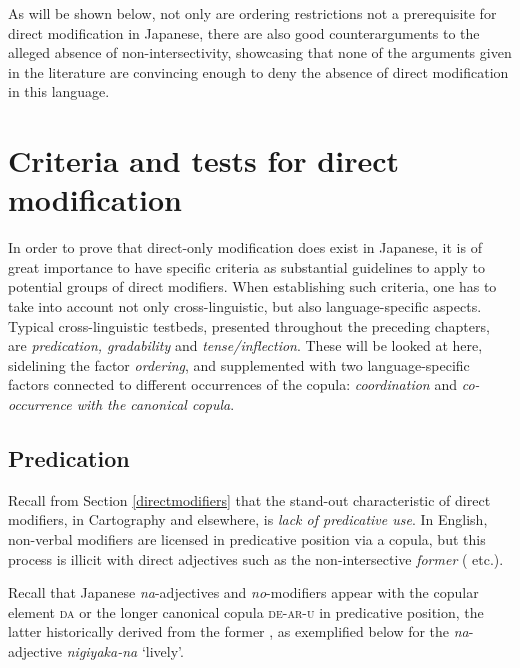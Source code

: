 As will be shown below, not only are ordering restrictions not a prerequisite for direct modification in Japanese, there are also good counterarguments to the alleged absence of non-intersectivity, showcasing that none of the arguments given in the literature are convincing enough to deny the absence of direct modification in this language.

\section{Criteria and tests for direct modification} \label{testsdirect}

In order to prove that direct-only modification does exist in Japanese, it is of great importance to have specific criteria as substantial guidelines to apply to potential groups of direct modifiers. When establishing such criteria, one has to take into account not only cross-linguistic, but also language-specific aspects. Typical cross-linguistic testbeds, presented throughout the preceding chapters, are \textit{predication, gradability} and \textit{tense/inflection}. These will be looked at here, sidelining the factor \textit{ordering}, and supplemented with two language-specific factors connected to different occurrences of the copula: \textit{coordination} and \textit{co-occurrence with the canonical copula}.

\subsection{Predication} \label{test predication}

Recall from Section \ref{directmodifiers} that the stand-out characteristic of direct modifiers, in Cartography and elsewhere, is \textit{lack of predicative use}. In English, non-verbal modifiers are licensed in predicative position via a copula, but this process is illicit with direct adjectives such as the non-intersective \textit{former} (\citealt{siegel:1976:capturing, larson:1998:events, cinque:2010:adj, cinque:2014:semantics} etc.).

Recall that Japanese \textit{na}-adjectives and \textit{no}-modifiers appear with the copular element \textsc{da} or the longer canonical copula \textsc{de-ar-u} in predicative position, the latter historically derived from the former \citep{urushibara:1993:syntactic, nishiyama:1999:adj, nakahara:2002:japanese, frellesvig:2010:history, miyama:2011:da}, as exemplified below for the \textit{na}-adjective \textit{nigiyaka-na} `lively’.

